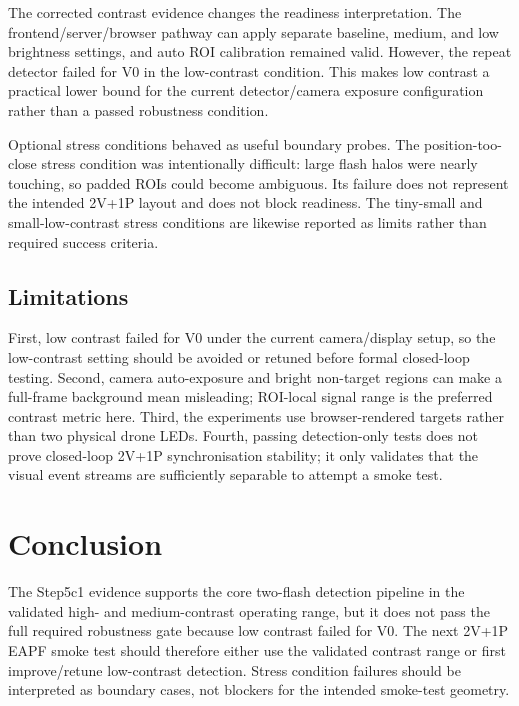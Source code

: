 \documentclass[11pt,a4paper]{article}
\begin{document}
The corrected contrast evidence changes the readiness interpretation. The
frontend/server/browser pathway can apply separate baseline, medium, and low
brightness settings, and auto ROI calibration remained valid. However, the
repeat detector failed for V0 in the low-contrast condition. This makes low
contrast a practical lower bound for the current detector/camera exposure
configuration rather than a passed robustness condition.

Optional stress conditions behaved as useful boundary probes. The
position-too-close stress condition was intentionally difficult: large flash
halos were nearly touching, so padded ROIs could become ambiguous. Its failure
does not represent the intended 2V+1P layout and does not block readiness. The
tiny-small and small-low-contrast stress conditions are likewise reported as
limits rather than required success criteria.

\subsection{Limitations}

First, low contrast failed for V0 under the current camera/display setup, so
the low-contrast setting should be avoided or retuned before formal closed-loop
testing. Second, camera auto-exposure and bright non-target regions can make a full-frame
background mean misleading; ROI-local signal range is the preferred contrast
metric here. Third, the experiments use browser-rendered targets rather than
two physical drone LEDs. Fourth, passing detection-only tests does not prove
closed-loop 2V+1P synchronisation stability; it only validates that the visual
event streams are sufficiently separable to attempt a smoke test.

\section{Conclusion}

The Step5c1 evidence supports the core two-flash detection pipeline in the
validated high- and medium-contrast operating range, but it does not pass the
full required robustness gate because low contrast failed for V0. The next
2V+1P EAPF smoke test should therefore either use the validated contrast range
or first improve/retune low-contrast detection. Stress condition failures
should be interpreted as boundary cases, not blockers for the intended
smoke-test geometry.

\appendix
\end{document}
